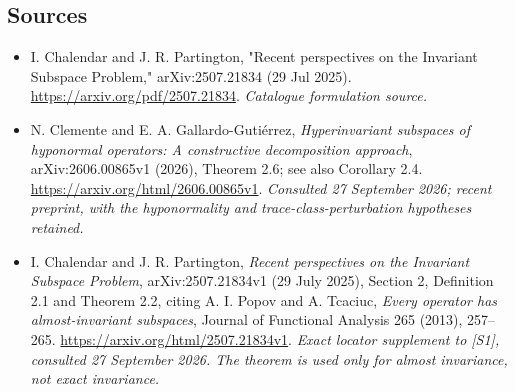 \documentclass[11pt,a4paper]{article}
\numberwithin{equation}{section}
\begin{document}
\subsection{Sources}
\begin{itemize}\raggedright
\item[\textnormal{[S1]}]\hypertarget{source:108:1}{} I. Chalendar and J. R. Partington, "Recent perspectives on the Invariant Subspace Problem," arXiv:2507.21834 (29 Jul 2025).
\url{https://arxiv.org/pdf/2507.21834}.
{\small\textit{Catalogue formulation source.}}
\item[\textnormal{[E1]}]\hypertarget{extra:108:1}{} N. Clemente and
E. A. Gallardo-Guti\'errez, \emph{Hyperinvariant subspaces of hyponormal
operators: A constructive decomposition approach}, arXiv:2606.00865v1
(2026), Theorem 2.6; see also Corollary 2.4.
\url{https://arxiv.org/html/2606.00865v1}.
{\small\textit{Consulted 27 September 2026; recent preprint, with the hyponormality and trace-class-perturbation hypotheses retained.}}
\item[\textnormal{[E2]}]\hypertarget{extra:108:2}{} I. Chalendar and
J. R. Partington, \emph{Recent perspectives on the Invariant Subspace
Problem}, arXiv:2507.21834v1 (29 July 2025), Section 2,
Definition 2.1 and Theorem 2.2, citing A. I. Popov and A. Tcaciuc,
\emph{Every operator has almost-invariant subspaces},
Journal of Functional Analysis 265 (2013), 257--265.
\url{https://arxiv.org/html/2507.21834v1}.
{\small\textit{Exact locator supplement to [S1], consulted 27 September 2026. The theorem is used only for almost invariance, not exact invariance.}}
\end{itemize}
\end{document}
